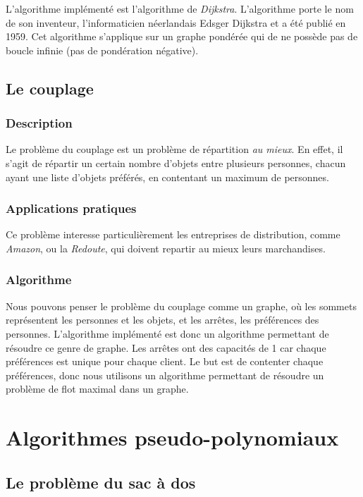 	L'algorithme implémenté est l'algorithme de \emph{Dijkstra}. L'algorithme porte le nom de son inventeur, 
	l'informaticien néerlandais Edsger Dijkstra et a été publié en 1959. Cet algorithme s'applique sur un graphe pondérée 
	qui de ne possède pas de boucle infinie (pas de pondération négative).

    \subsection{Le couplage}
        \subsubsection{Description}
            Le problème du couplage est un problème de répartition \emph{au mieux}.
            En effet, il s'agit de répartir un certain nombre d'objets
            entre plusieurs personnes, chacun ayant une liste d'objets
            préférés, en contentant un maximum de personnes.
        \subsubsection{Applications pratiques}
            Ce problème interesse particulièrement les entreprises
            de distribution, comme \emph{Amazon},
            ou la \emph{Redoute}, qui doivent
            repartir au mieux leurs marchandises.
        \subsubsection{Algorithme}
		Nous pouvons penser le problème du couplage comme un graphe,
		 où les sommets représentent les personnes et les objets,
		 et les arrêtes, les préférences des personnes.
		L'algorithme implémenté est donc un algorithme permettant
		 de résoudre ce genre de graphe.
		Les arrêtes ont des capacités de 1 car chaque préférences est unique
		 pour chaque client.
		Le but est de contenter chaque préférences, donc nous utilisons un
		 algorithme permettant de résoudre un problème de flot maximal
		 dans un graphe.



\section{Algorithmes pseudo-polynomiaux}
    \subsection{Le problème du sac à dos}
